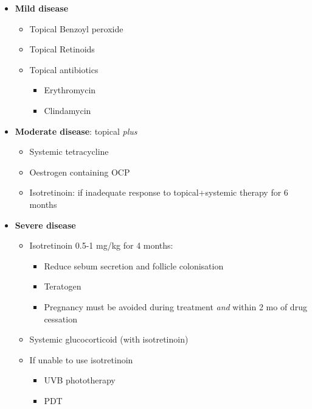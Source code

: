 \documentclass[
  12pt,
]{memoir}
\providecommand{\tightlist}{%
  \setlength{\itemsep}{0pt}\setlength{\parskip}{0pt}}
\begin{document}
\begin{itemize}
\tightlist
\item
  \textbf{Mild disease}

  \begin{itemize}
  \tightlist
  \item
    Topical Benzoyl peroxide
  \item
    Topical Retinoids
  \item
    Topical antibiotics

    \begin{itemize}
    \tightlist
    \item
      Erythromycin
    \item
      Clindamycin
    \end{itemize}
  \end{itemize}
\item
  \textbf{Moderate disease}: topical \emph{plus}

  \begin{itemize}
  \tightlist
  \item
    Systemic tetracycline
  \item
    Oestrogen containing OCP
  \item
    Isotretinoin: if inadequate response to topical+systemic therapy for
    6 months
  \end{itemize}
\item
  \textbf{Severe disease}

  \begin{itemize}
  \tightlist
  \item
    Isotretinoin 0.5-1 mg/kg for 4 months:

    \begin{itemize}
    \tightlist
    \item
      Reduce sebum secretion and follicle colonisation
    \item
      Teratogen
    \item
      Pregnancy must be avoided during treatment \emph{and} within 2 mo
      of drug cessation
    \end{itemize}
  \item
    Systemic glucocorticoid (with isotretinoin)
  \item
    If unable to use isotretinoin

    \begin{itemize}
    \tightlist
    \item
      UVB phototherapy
    \item
      PDT
    \end{itemize}
  \end{itemize}
\end{itemize}
\end{document}
